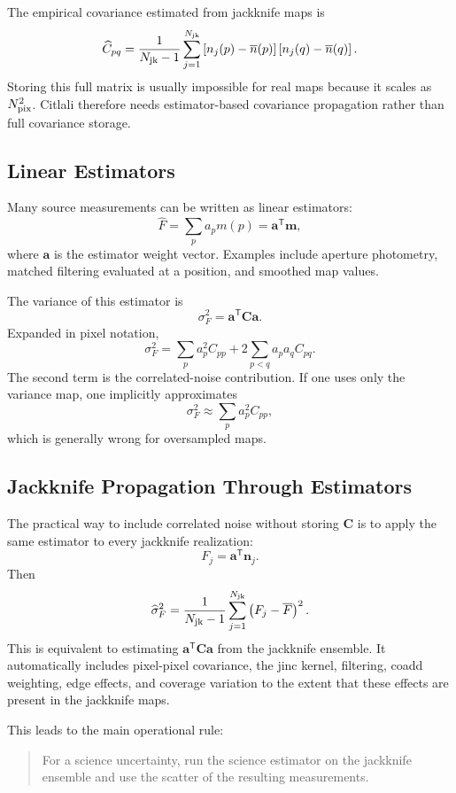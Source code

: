 \documentclass[11pt]{article}
\newcommand{\map}{\boldsymbol{m}}
\newcommand{\noise}{\boldsymbol{n}}
\newcommand{\cov}{\boldsymbol{C}}
\newcommand{\mat}[1]{\boldsymbol{#1}}
\newcommand{\trans}{\mathsf{T}}
\begin{document}
The empirical covariance estimated from jackknife maps is
\[
  \widehat{C}_{pq} =
    \frac{1}{N_{\rm jk}-1}
    \sum_{j=1}^{N_{\rm jk}}
    \left[n_j(p)-\overline{n}(p)\right]
    \left[n_j(q)-\overline{n}(q)\right].
\]
Storing this full matrix is usually impossible for real maps because it scales
as \(N_{\rm pix}^2\). Citlali therefore needs estimator-based covariance
propagation rather than full covariance storage.

\subsection{Linear Estimators}

Many source measurements can be written as linear estimators:
\[
  \widehat{F} =
    \sum_p a_p m(p)
    =
    \mat{a}^\trans \map,
\]
where \(\mat{a}\) is the estimator weight vector. Examples include aperture
photometry, matched filtering evaluated at a position, and smoothed map values.

The variance of this estimator is
\[
  \sigma_F^2 =
    \mat{a}^\trans \cov \mat{a}.
\]
Expanded in pixel notation,
\[
  \sigma_F^2 =
    \sum_p a_p^2 C_{pp}
    +
    2\sum_{p<q} a_p a_q C_{pq}.
\]
The second term is the correlated-noise contribution. If one uses only the
variance map, one implicitly approximates
\[
  \sigma_F^2 \approx \sum_p a_p^2 C_{pp},
\]
which is generally wrong for oversampled maps.

\subsection{Jackknife Propagation Through Estimators}

The practical way to include correlated noise without storing \(\cov\) is to
apply the same estimator to every jackknife realization:
\[
  F_j =
    \mat{a}^\trans \noise_j.
\]
Then
\[
  \widehat{\sigma}_F^2 =
    \frac{1}{N_{\rm jk}-1}
    \sum_{j=1}^{N_{\rm jk}}
    \left(F_j - \overline{F}\right)^2.
\]
This is equivalent to estimating \(\mat{a}^\trans \cov \mat{a}\) from the
jackknife ensemble. It automatically includes pixel-pixel covariance, the jinc
kernel, filtering, coadd weighting, edge effects, and coverage variation to the
extent that these effects are present in the jackknife maps.

This leads to the main operational rule:

\begin{quote}
For a science uncertainty, run the science estimator on the jackknife ensemble
and use the scatter of the resulting measurements.
\end{quote}
\end{document}
